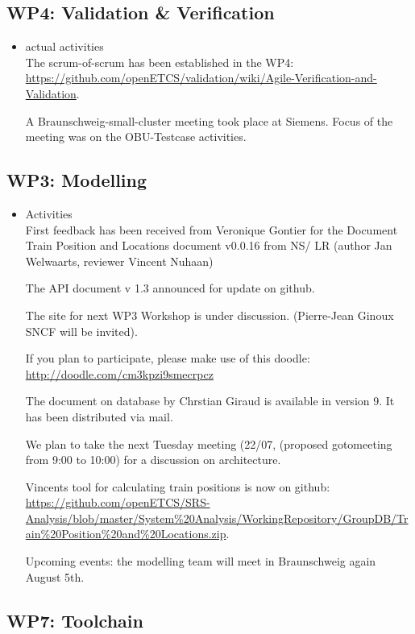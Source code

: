 \documentclass[a4paper, 11pt]{article}
\begin{document}
\subsection{WP4: Validation \& Verification}
\begin{itemize}
\item actual activities\\
The scrum-of-scrum has been established in the WP4: \url{https://github.com/openETCS/validation/wiki/Agile-Verification-and-Validation}. 

A Braunschweig-small-cluster meeting took place at Siemens. Focus of the meeting was on the OBU-Testcase activities.

\end{itemize}

\subsection{WP3: Modelling}

\begin{itemize}
\item Activities\\
First feedback has been received from Veronique Gontier for the Document Train Position and Locations document v0.0.16 from NS/ LR (author Jan Welwaarts, reviewer Vincent Nuhaan) 

The API document v 1.3 announced for update on github.

The site for next WP3 Workshop is under discussion. (Pierre-Jean Ginoux SNCF will be invited).

If you plan to participate, please make use of this doodle: \url{http://doodle.com/cm3kpzi9smecrpcz}

The document on database by Chrstian Giraud is available in version 9. It has been distributed via mail.

We plan to take the next Tuesday meeting (22/07, (proposed gotomeeting from 9:00 to 10:00) for a discussion on architecture.

Vincents tool for calculating train positions is now on github: \url{https://github.com/openETCS/SRS-Analysis/blob/master/System%20Analysis/WorkingRepository/GroupDB/Train%20Position%20and%20Locations.zip}.

Upcoming events: the modelling team will meet in Braunschweig again August 5th. 

\end{itemize}

\subsection{WP7: Toolchain}
\end{document}
